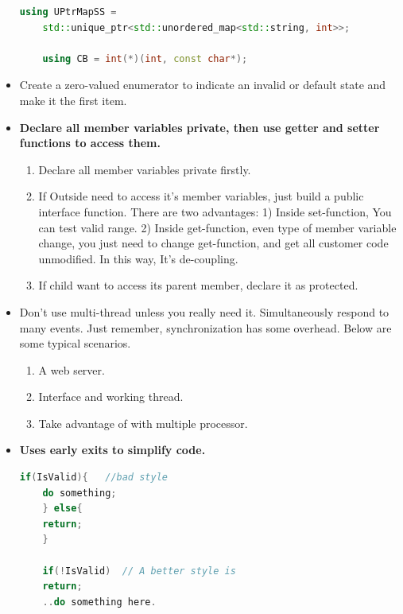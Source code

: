 \documentclass[a4paper,11pt,twoside]{book}
\begin{document}
\begin{itemize}
	\begin{lstlisting}[frame=single, language=c++]
	using UPtrMapSS =
	std::unique_ptr<std::unordered_map<std::string, int>>;
	
	using CB = int(*)(int, const char*);
	\end{lstlisting}
	
	\item Create a zero-valued enumerator to indicate an invalid or default state and make it the first item.
	
	\item \textbf{Declare all member variables private, then use getter and setter functions to access them.}
	\begin{enumerate}
		\item Declare all member variables private firstly.
		
		\item If Outside need to access it's member variables, just build a public interface function. There are two advantages: 1) Inside set-function, You can test valid range. 2) Inside get-function, even type of member variable change, you just need to change get-function, and get all customer code unmodified. In this way, It's de-coupling.
		
		\item If child want to access its parent member, declare it as protected.
		
	\end{enumerate}
	
	\item Don't use multi-thread unless you really need it. Simultaneously respond to many events. Just remember, synchronization has some overhead. Below are some typical scenarios.
	\begin{enumerate}
		\item A web server.
		\item Interface and working thread.
		\item Take advantage of with multiple processor.
	\end{enumerate}
	
	\item \textbf{Uses early exits to simplify code.}
	
	\begin{lstlisting}[frame=single, language=c++]
	if(IsValid){   //bad style
	do something;
	} else{
	return;
	}
	
	if(!IsValid)  // A better style is
	return;
	..do something here.
	\end{lstlisting}
	

\end{itemize}
\end{document}
